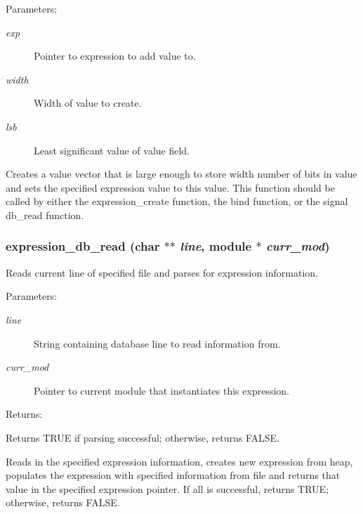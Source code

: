\begin{Desc}
\item[Parameters: ]\par
\begin{description}
\item[{\em 
exp}]Pointer to expression to add value to. \item[{\em 
width}]Width of value to create. \item[{\em 
lsb}]Least significant value of value field.\end{description}
\end{Desc}
Creates a value vector that is large enough to store width number of bits in value and sets the specified expression value to this value. This function should be called by either the expression\_\-create function, the bind function, or the signal db\_\-read function. 
\subsubsection{ expression\_\-db\_\-read (char $\ast$$\ast$ {\em line}, {\bf module} $\ast$ {\em curr\_\-mod})}\label{expr_8c_a11}


Reads current line of specified file and parses for expression information.

\begin{Desc}
\item[Parameters: ]\par
\begin{description}
\item[{\em 
line}]String containing database line to read information from. \item[{\em 
curr\_\-mod}]Pointer to current module that instantiates this expression.\end{description}
\end{Desc}
\begin{Desc}
\item[Returns: ]\par
Returns TRUE if parsing successful; otherwise, returns FALSE.\end{Desc}
Reads in the specified expression information, creates new expression from heap, populates the expression with specified information from file and  returns that value in the specified expression pointer. If all is  successful, returns TRUE; otherwise, returns FALSE. 
